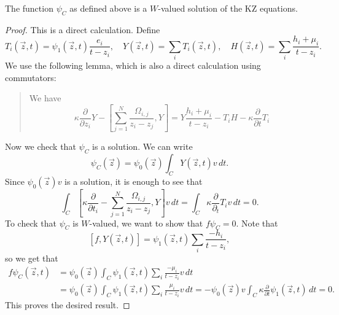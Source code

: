 \begin{prop}
The function $\psi_C$ as defined above
is a $W$-valued solution of the KZ equations.
\end{prop}

\begin{proof}
  This is a direct calculation. Define
  \[
    T_i(\vec{z}, t)
    = \psi_1(\vec{z}, t) \frac{e_i}{t - z_i},
    \quad
    Y(\vec{z}, t)
    = \sum_i T_i(\vec{z}, t), \quad
    H(\vec{z}, t)
    = \sum_i \frac{h_i + \mu_i}{t - z_i}.
  \]
  We use the following lemma, which is also
  a direct calculation using commutators:
  \begin{quote}
    \vspace{-2em}
    \begin{lemma}
  We have
  \[
    \kappa \frac{\partial}{\partial z_i} Y
    - \left[\sum_{j = 1}^N \frac{\Omega_{i, j}}{z_i - z_j}, Y\right]
    = Y \frac{h_i + \mu_i}{t - z_i}
    - T_i H - \kappa \frac{\partial}{\partial t} T_i
  \]
    \end{lemma}
  \end{quote}
  Now we check that $\psi_C$ is a solution.
  We can write
  \[
    \psi_C(\vec{z})
    = \psi_0(\vec{z}) \int_C Y(\vec{z}, t) v\, dt.
  \]
  Since $\psi_0(\vec{z}) v$ is a solution, it
  is enough to see that
  \[
    \int_C \left[
      \kappa \frac{\partial}{\partial t_i}
      - \sum_{j = 1}^N \frac{\Omega_{i, j}}{z_i - z_j}, Y
    \right] v\, dt
    = \int_C \kappa \frac{\partial}{\partial_t} T_i v\, dt = 0.
  \]
  To check that $\psi_C$ is $W$-valued, we
  want to show that
  $f \psi_C = 0$. Note that
  \[
    [f, Y(\vec{z}, t)]
    = \psi_1(\vec{z}, t) \sum_i \frac{-h_i}{t - z_i},
  \]
  so we get that
  \begin{align*}
    f \psi_C(\vec{z}, t)
    &= \psi_0(\vec{z}) \int_C \psi_1(\vec{z}, t) \sum_i \frac{-\mu_i}{t - z_i} v\, dt \\
    &= \psi_0(\vec{z})
    \int_C \psi_1(\vec{z}, t) \sum_i \frac{\mu_i}{t - z_i} v\, dt
    = 
    -\psi_0(\vec{z}) v \int_C \kappa \frac{\partial}{\partial t} \psi_1(\vec{z}, t)\, dt = 0.
  \end{align*}
  This proves the desired result.
\end{proof}

